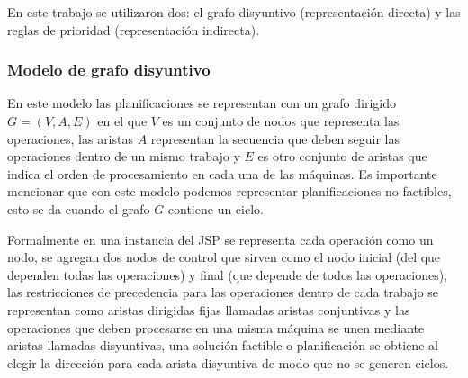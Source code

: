 En este trabajo se utilizaron dos: el grafo disyuntivo (representación directa) y las reglas de prioridad (representación indirecta).
\subsubsection*{Modelo de grafo disyuntivo} 
En este modelo las planificaciones se representan con un grafo dirigido $G=(V,A,E)$ en el que $V$ es un conjunto de nodos que representa las operaciones, las aristas $A$ representan la secuencia que deben seguir las operaciones dentro de un mismo trabajo y $E$ es otro conjunto de aristas que indica el orden de procesamiento en cada una de las máquinas. Es importante mencionar que con este modelo podemos representar planificaciones no factibles, esto se da cuando el grafo $G$ contiene un ciclo.


Formalmente en una instancia del JSP se representa cada operación como un nodo, se agregan dos nodos de control que sirven como el nodo inicial (del que dependen todas las operaciones) y final (que depende de todos las operaciones), las restricciones de precedencia para las operaciones dentro de cada trabajo se representan como aristas dirigidas fijas llamadas aristas conjuntivas y las operaciones que deben procesarse en una misma máquina se unen mediante aristas llamadas disyuntivas, una solución factible o planificación se obtiene al elegir la dirección para cada arista disyuntiva de modo que no se generen ciclos.   

